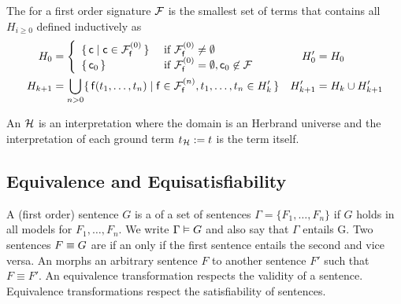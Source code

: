 \begin{definition}\label{def:hk}
	The  for a first order signature \( \mathcal{F} \)
	is the smallest set of terms that contains all \( H_{i\geq 0} \) defined inductively as
	\begin{align*}
	H_0 &=
	\left \{
	\begin{array}{ll}
	\{ \, \mc \mid \mc\in\mcFfn[0] \, \} 
	&\text{if } \mcFfn[0]\not=\emptyset
	\\
	\{ \, \mc_0 \, \}
	&\text{if } \mcFfn[0]=\emptyset, \mc_0\not\in\mcF
	\end{array}
	\right.
	&
	H'_0 &= H_0
	\\
	H_{k+1} &= \bigcup_{n> 0}
	\{ \, \mf(t_1, \ldots, t_n) \mid{} \mf\in\mcFfn[n],
	t_1, \ldots, t_n \in{} H_k' \, \}
	&
	H'_{k+1} &= H_k \cup{} H'_{k+1}
	\end{align*}

\end{definition}

\begin{definition}
	An  \( \mathcal{H} \) is an interpretation where the domain
	is an Herbrand universe
	and the interpretation of each ground term \( t_{\mathcal{H}} := t \) is the term itself.
\end{definition}





\subsection{Equivalence and Equisatisfiability}

\begin{definition}
	A (first order) sentence \( G \) is a  of a set of sentences
	\( \Gamma = \{ F_1,\ldots,F_n \} \) if \( G \) holds in all models for \( F_1,\ldots,F_n \).
	We write \( \Gamma\vDash G \) and also say that \( \Gamma \) entails G.
	Two sentences \( F \equiv G \) are 
	if an only if the first sentence entails the second and vice versa.
	An  morphs an arbitrary sentence \(F\)
	to another sentence \(F'\) such that \( F\equiv F'\).
	An equivalence transformation respects the validity of a sentence.
	Equivalence transformations respect the satisfiability of sentences.
\end{definition}

